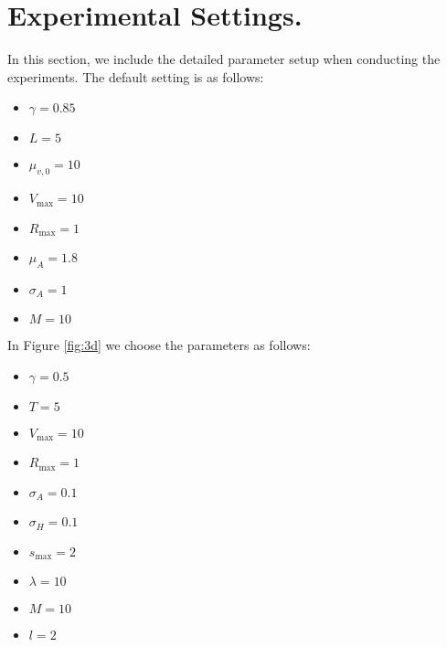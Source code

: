 \section{Experimental Settings.} \label{app:exp}
In this section, we include the detailed parameter setup when conducting the experiments. The default setting is as follows: 
\begin{itemize}
    \item $\gamma = 0.85$
\item $L = 5$
\item $\mu_{v,0} = 10$
\item $V_{\max}= 10$
\item $R_{\max} = 1$
\item $\mu_A = 1.8$
\item $\sigma_A = 1$
\item $M = 10$
\end{itemize}


In Figure \ref{fig:3d} we choose the parameters as follows: 

\begin{itemize}
    \item $\gamma = 0.5$
    \item $T = 5$
    \item $V_{\max}= 10$
    \item $R_{\max} = 1$
    \item $\sigma_A = 0.1$
    \item $\sigma_H=0.1$
    \item $s_{\max}=2$
    \item $\lambda = 10$
    \item $M = 10$
    \item $l=2$
\end{itemize}

